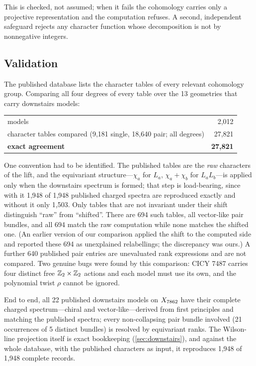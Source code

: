 This is checked, not assumed; when it fails the cohomology carries only a
projective representation and the computation refuses. A second, independent
safeguard rejects any character function whose decomposition is not by
nonnegative integers.

\subsection{Validation}

The published database lists the character tables of every relevant cohomology
group. Comparing all four degrees of every table over the 13 geometries that
carry downstairs models:

\begin{center}\small
\begin{tabular}{@{}lr@{}}
\toprule
models & 2,012 \\
character tables compared (9,181 single, 18,640 pair; all degrees) & 27,821 \\
\textbf{exact agreement} & \textbf{27,821} \\
\bottomrule
\end{tabular}
\end{center}

One convention had to be identified. The published tables are the \emph{raw}
characters of the lift, and the equivariant structure---$\chi_a$ for $L_a$,
$\chi_a+\chi_b$ for $L_aL_b$---is applied only when the downstairs spectrum is
formed; that step is load-bearing, since with it 1,948 of 1,948 published charged
spectra are reproduced exactly and without it only 1,503. Only tables that are
not invariant under their shift distinguish ``raw'' from ``shifted''. There are
694 such tables, all vector-like pair bundles, and all 694 match the raw
computation while none matches the shifted one. (An earlier version of our
comparison applied the shift to the computed side and reported these 694 as
unexplained relabellings; the discrepancy was ours.) A further 640 published pair
entries are unevaluated rank expressions and are not compared. Two genuine bugs
were found by this comparison: CICY 7487 carries four distinct free
$\mathbb{Z}_2\times\mathbb{Z}_2$ actions and each model must use its own, and the polynomial twist
$\rho$ cannot be ignored.

End to end, all 22 published downstairs models on $X_{7862}$ have their complete
charged spectrum---chiral and vector-like---derived from first principles and
matching the published spectra; every non-collapsing pair bundle involved (21
occurrences of 5 distinct bundles) is resolved by equivariant ranks. The Wilson-line projection itself is exact
bookkeeping (\cref{sec:downstairs}), and against the whole database, with the
published characters as input, it reproduces 1,948 of 1,948 complete records.
